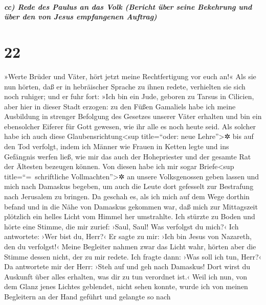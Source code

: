 \hypertarget{cc-rede-des-paulus-an-das-volk-bericht-uxfcber-seine-bekehrung-und-uxfcber-den-von-jesus-empfangenen-auftrag}{%
\subparagraph{cc) Rede des Paulus an das Volk (Bericht über seine
Bekehrung und über den von Jesus empfangenen
Auftrag)}\label{cc-rede-des-paulus-an-das-volk-bericht-uxfcber-seine-bekehrung-und-uxfcber-den-von-jesus-empfangenen-auftrag}}

\hypertarget{section-21}{%
\section{22}\label{section-21}}

 »Werte Brüder und Väter, hört jetzt meine Rechtfertigung
vor euch an!«  Als sie nun hörten, daß er in hebräischer
Sprache zu ihnen redete, verhielten sie sich noch ruhiger; und er fuhr
fort:  »Ich bin ein Jude, geboren zu Tarsus in Cilicien,
aber hier in dieser Stadt erzogen: zu den Füßen Gamaliels habe ich meine
Ausbildung in strenger Befolgung des Gesetzes unserer Väter erhalten und
bin ein ebensolcher Eiferer für Gott gewesen, wie ihr alle es noch heute
seid.  Als solcher habe ich auch diese
Glaubensrichtung\textless sup title=``oder: neue Lehre''\textgreater✲
bis auf den Tod verfolgt, indem ich Männer wie Frauen in Ketten legte
und ins Gefängnis werfen ließ,  wie mir das auch der
Hohepriester und der gesamte Rat der Ältesten bezeugen können. Von
diesen habe ich mir sogar Briefe\textless sup title=``=~schriftliche
Vollmachten''\textgreater✲ an unsere Volksgenossen geben lassen und mich
nach Damaskus begeben, um auch die Leute dort gefesselt zur Bestrafung
nach Jerusalem zu bringen.  Da geschah es, als ich mich
auf dem Wege dorthin befand und in die Nähe von Damaskus gekommen war,
daß mich zur Mittagszeit plötzlich ein helles Licht vom Himmel her
umstrahlte.  Ich stürzte zu Boden und hörte eine Stimme,
die mir zurief: ›Saul, Saul! Was verfolgst du mich?‹  Ich
antwortete: ›Wer bist du, Herr?‹ Er sagte zu mir: ›Ich bin Jesus von
Nazareth, den du verfolgst!‹  Meine Begleiter nahmen zwar
das Licht wahr, hörten aber die Stimme dessen nicht, der zu mir redete.
 Ich fragte dann: ›Was soll ich tun, Herr?‹ Da antwortete
mir der Herr: ›Steh auf und geh nach Damaskus! Dort wirst du Auskunft
über alles erhalten, was dir zu tun verordnet ist.‹  Weil
ich nun, von dem Glanz jenes Lichtes geblendet, nicht sehen konnte,
wurde ich von meinen Begleitern an der Hand geführt und gelangte so nach

